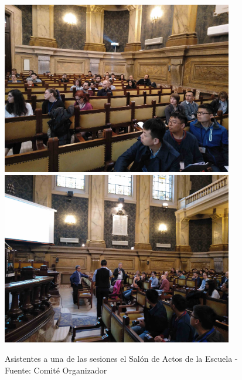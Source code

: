 \documentclass[twoside]{article}
\begin{document}
\begin{center}
\begin{figure}
	\centering
		\includegraphics[width=0.9\textwidth]{SalonActos}
		\includegraphics[width=0.9\textwidth]{SalonActos2}
	\label{fig:SalActs}
	\caption{Asistentes a una de las sesiones el Salón de Actos de la Escuela  - Fuente: Comité Organizador}
\end{figure}
\end{center}
%
\end{document}
